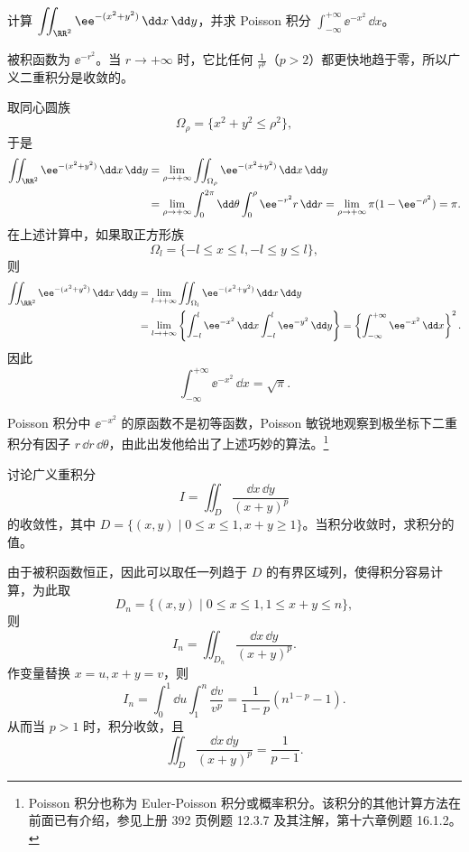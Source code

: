 \begin{xexample}[22.4.1]
计算 $\displaystyle\iint_{\RR^2}\ee^{-(x^2+y^2)}\,\dd x\,\dd y$，并求 Poisson 积分 $\displaystyle\int_{-\infty}^{+\infty}\ee^{-x^2}\,\dd x$。
\end{xexample}
\begin{xsolution}
被积函数为 $\ee^{-r^2}$。当 $r\to+\infty$ 时，它比任何 $\frac1{r^p}$（$p>2$）都更快地趋于零，所以广义二重积分是收敛的。

取同心圆族
\[
  \Omega_\rho=\{x^2+y^2\le\rho^2\},
\]
于是
\begin{align*}
  \iint_{\RR^2}\ee^{-(x^2+y^2)}\,\dd x\,\dd y
  &=\lim_{\rho\to+\infty}\iint_{\Omega_\rho}\ee^{-(x^2+y^2)}\,\dd x\,\dd y\\
  &=\lim_{\rho\to+\infty}\int_0^{2\pi}\dd\theta\int_0^\rho\ee^{-r^2}r\,\dd r
  =\lim_{\rho\to+\infty}\pi(1-\ee^{-\rho^2})=\pi.
\end{align*}
在上述计算中，如果取正方形族
\[
  \Omega_l=\{-l\le x\le l,-l\le y\le l\},
\]
则
\begin{align*}
  \iint_{\RR^2}\ee^{-(x^2+y^2)}\,\dd x\,\dd y
  &=\lim_{l\to+\infty}\iint_{\Omega_l}\ee^{-(x^2+y^2)}\,\dd x\,\dd y\\
  &=\lim_{l\to+\infty}\left\{\int_{-l}^l\ee^{-x^2}\,\dd x\int_{-l}^l\ee^{-y^2}\,\dd y\right\}
  =\left\{\int_{-\infty}^{+\infty}\ee^{-x^2}\,\dd x\right\}^2.
\end{align*}
因此
\[
  \int_{-\infty}^{+\infty}\ee^{-x^2}\,\dd x=\sqrt\pi.
\]
\end{xsolution}

\begin{xremark}
Poisson 积分中 $\ee^{-x^2}$ 的原函数不是初等函数，Poisson 敏锐地观察到极坐标下二重积分有因子 $r\,\dd r\,\dd\theta$，由此出发他给出了上述巧妙的算法。\footnote{Poisson 积分也称为 Euler-Poisson 积分或概率积分。该积分的其他计算方法在前面已有介绍，参见上册 392 页例题 12.3.7 及其注解，第十六章例题 16.1.2。}
\end{xremark}

\begin{xexample}[22.4.2]
讨论广义重积分
\[
  I=\iint_D\frac{\dd x\,\dd y}{(x+y)^p}
\]
的收敛性，其中 $D=\{(x,y)\mid0\le x\le1,x+y\ge1\}$。当积分收敛时，求积分的值。
\end{xexample}
\begin{xsolution}
由于被积函数恒正，因此可以取任一列趋于 $D$ 的有界区域列，使得积分容易计算，为此取
\[
  D_n=\{(x,y)\mid0\le x\le1,1\le x+y\le n\},
\]
则
\[
  I_n=\iint_{D_n}\frac{\dd x\,\dd y}{(x+y)^p}.
\]
作变量替换 $x=u,x+y=v$，则
\[
  I_n=\int_0^1\dd u\int_1^n\frac{\dd v}{v^p}
  =\frac1{1-p}(n^{1-p}-1).
\]
从而当 $p>1$ 时，积分收敛，且
\[
  \iint_D\frac{\dd x\,\dd y}{(x+y)^p}=\frac1{p-1}.
\]
\end{xsolution}

